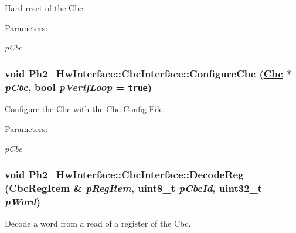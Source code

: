 Hard reset of the Cbc. 

\begin{Desc}
\item[Parameters:]
\begin{description}
\item[{\em p\-Cbc}]\end{description}
\end{Desc}
\hypertarget{class_ph2___hw_interface_1_1_cbc_interface_845ae259c43b47f62ce58aacc042f491}{
\subsubsection[ConfigureCbc]{\setlength{\rightskip}{0pt plus 5cm}void Ph2\_\-Hw\-Interface::Cbc\-Interface::Configure\-Cbc (\hyperlink{class_ph2___hw_description_1_1_cbc}{Cbc} $\ast$ {\em p\-Cbc}, bool {\em p\-Verif\-Loop} = {\tt true})}}
\label{class_ph2___hw_interface_1_1_cbc_interface_845ae259c43b47f62ce58aacc042f491}


Configure the Cbc with the Cbc Config File. 

\begin{Desc}
\item[Parameters:]
\begin{description}
\item[{\em p\-Cbc}]\end{description}
\end{Desc}
\hypertarget{class_ph2___hw_interface_1_1_cbc_interface_f9f86fa0a60d5f2be2de715f97fd169d}{
\subsubsection[DecodeReg]{\setlength{\rightskip}{0pt plus 5cm}void Ph2\_\-Hw\-Interface::Cbc\-Interface::Decode\-Reg (\hyperlink{struct_ph2___hw_description_1_1_cbc_reg_item}{Cbc\-Reg\-Item} \& {\em p\-Reg\-Item}, uint8\_\-t {\em p\-Cbc\-Id}, uint32\_\-t {\em p\-Word})}}
\label{class_ph2___hw_interface_1_1_cbc_interface_f9f86fa0a60d5f2be2de715f97fd169d}


Decode a word from a read of a register of the Cbc. 

